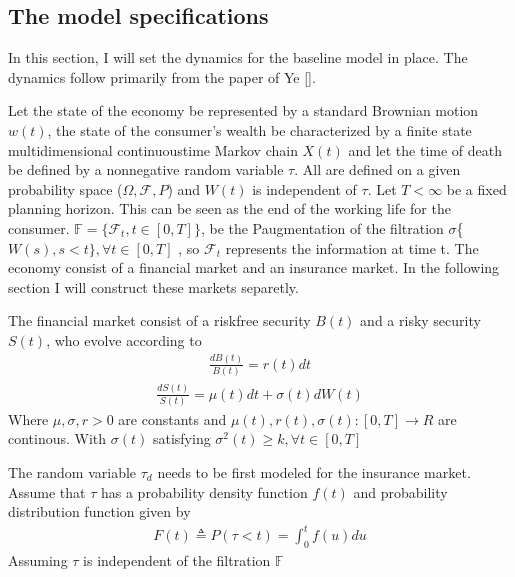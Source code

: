 \documentclass[letterpaper,10pt,english]{jupyterBook}
\begin{document}
\subsection{The model specifications}
\label{\detokenize{Financial_application:the-model-specifications}}
\sphinxAtStartPar
In this section, I will set the dynamics for the baseline model in place. The dynamics follow primarily from the paper of Ye {[}{]}.

\sphinxAtStartPar
Let the state of the economy be represented by a standard Brownian motion \(w(t)\), the state of the consumer’s wealth be characterized by a finite state multi\sphinxhyphen{}dimensional continuous\sphinxhyphen{}time Markov chain \(X(t)\) and let the time of death be defined by a non\sphinxhyphen{}negative random variable \(\tau\). All are defined on a given probability space (\(\Omega, \mathcal{F}, P\)) and \(W(t)\) is independent of \(\tau\). Let \(T< \infty\) be a fixed planning horizon. This can be seen as the end of the working life for the consumer. \(\mathbb{F} = \{\mathcal{F}_t, t \in [0,T]\}\), be the P\sphinxhyphen{}augmentation of the filtration \(\sigma\)\{\(W(s), s<t \}, \forall t \in [0,T]\) , so \(\mathcal{F}_t\) represents the information at time t. The economy consist of a financial market and an insurance market. In the following section I will construct these markets separetly.

\sphinxAtStartPar
The financial market consist of a risk\sphinxhyphen{}free security \(B(t)\) and a risky security \(S(t)\), who evolve according to
\begin{equation*}
\begin{split} \frac{dB(t)}{B(t)}=r(t)dt \end{split}
\end{equation*}\begin{equation*}
\begin{split} \frac{dS(t)}{S(t)}=\mu(t)dt+\sigma(t)dW(t)\end{split}
\end{equation*}
\sphinxAtStartPar
Where \(\mu, \sigma, r > 0\) are constants and \(\mu(t), r(t), \sigma(t): [0,T] \to R\) are continous. With \(\sigma(t)\) satisfying \(\sigma^2(t) \ge k, \forall t \in [0,T]\)

\sphinxAtStartPar
The random variable \(\tau_d\) needs to be first modeled for the insurance  market. Assume that \(\tau\) has a probability density function \(f(t)\) and probability distribution function given by
\begin{equation*}
\begin{split} F(t) \triangleq P(\tau < t) = \int_0^t f(u) du \end{split}
\end{equation*}
\sphinxAtStartPar
Assuming \(\tau\) is independent of the filtration \(\mathbb{F}\)
\end{document}
